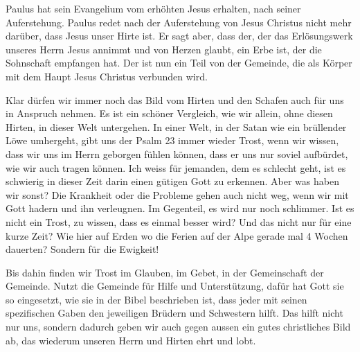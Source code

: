 \begin{otsblock}[Einführung]
\begin{otsblock}
        Paulus hat sein Evangelium vom erhöhten Jesus erhalten, nach seiner Auferstehung.
        Paulus redet nach der Auferstehung von Jesus Christus nicht mehr darüber, dass Jesus unser Hirte ist. Er sagt aber, dass der, der das Erlösungswerk unseres Herrn Jesus annimmt und von Herzen glaubt, ein Erbe ist, der die Sohnschaft empfangen hat. Der ist nun ein Teil von der Gemeinde, die als Körper mit dem Haupt Jesus Christus verbunden wird.  


        Klar dürfen wir immer noch das Bild vom Hirten und den Schafen auch für uns in Anspruch nehmen. Es ist ein schöner Vergleich, wie wir allein, ohne diesen Hirten, in dieser Welt untergehen. In einer Welt, in der Satan wie ein brüllender Löwe umhergeht,  gibt uns der Psalm 23 immer wieder Trost, wenn wir wissen, dass wir uns im Herrn geborgen fühlen können, dass er uns nur soviel aufbürdet, wie wir auch tragen können. Ich weiss für jemanden, dem es schlecht geht, ist es schwierig in dieser Zeit darin einen gütigen Gott zu erkennen. Aber was haben wir sonst? Die Krankheit oder die Probleme gehen auch nicht weg, wenn wir mit Gott hadern und ihn verleugnen. Im Gegenteil, es wird nur noch schlimmer. Ist es nicht ein Trost, zu wissen, dass es einmal besser wird? Und das nicht nur für eine kurze Zeit? Wie hier auf Erden wo die Ferien auf der Alpe gerade mal 4 Wochen dauerten? Sondern für die Ewigkeit!

        Bis dahin finden wir Trost im Glauben, im Gebet, in der Gemeinschaft der Gemeinde. Nutzt die Gemeinde für Hilfe und Unterstützung, dafür hat Gott sie so eingesetzt, wie sie in der Bibel beschrieben ist, dass jeder mit seinen spezifischen Gaben den jeweiligen Brüdern und Schwestern hilft. Das hilft nicht nur uns, sondern dadurch geben wir auch gegen aussen ein gutes christliches Bild ab, das wiederum unseren Herrn und Hirten ehrt und lobt.

    \end{otsblock}


\end{otsblock}